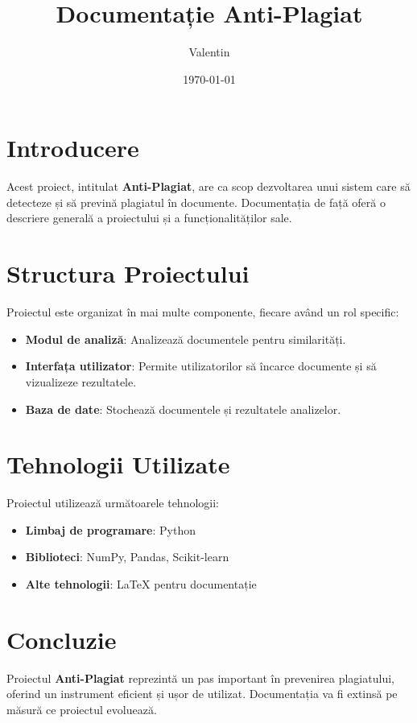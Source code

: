 \documentclass[a4paper,12pt]{article}
\title{Documentație Anti-Plagiat}
\author{Valentin}
\date{\today}
\begin{document}
\maketitle

\tableofcontents
\newpage

\section{Introducere}
Acest proiect, intitulat \textbf{Anti-Plagiat}, are ca scop dezvoltarea unui sistem care să detecteze și să prevină plagiatul în documente. Documentația de față oferă o descriere generală a proiectului și a funcționalităților sale.

\section{Structura Proiectului}
Proiectul este organizat în mai multe componente, fiecare având un rol specific:
\begin{itemize}
    \item \textbf{Modul de analiză}: Analizează documentele pentru similarități.
    \item \textbf{Interfața utilizator}: Permite utilizatorilor să încarce documente și să vizualizeze rezultatele.
    \item \textbf{Baza de date}: Stochează documentele și rezultatele analizelor.
\end{itemize}

\section{Tehnologii Utilizate}
Proiectul utilizează următoarele tehnologii:
\begin{itemize}
    \item \textbf{Limbaj de programare}: Python
    \item \textbf{Biblioteci}: NumPy, Pandas, Scikit-learn
    \item \textbf{Alte tehnologii}: LaTeX pentru documentație
\end{itemize}

\section{Concluzie}
Proiectul \textbf{Anti-Plagiat} reprezintă un pas important în prevenirea plagiatului, oferind un instrument eficient și ușor de utilizat. Documentația va fi extinsă pe măsură ce proiectul evoluează.
\end{document}
